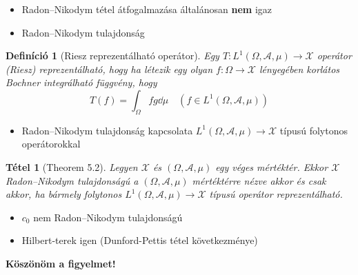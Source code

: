 \documentclass{beamer} %
\newtheorem{theo}[lem]{Tétel}
\newtheorem{defi}[lem]{Definíció}
\begin{document}
\begin{frame}
\justifying
\begin{itemize}
\item Radon\---Nikodym tétel átfogalmazása általánosan \textbf{nem} igaz
\pause \item Radon\---Nikodym tulajdonság
\end{itemize}
\pause \begin{defi}[Riesz reprezentálható operátor] Egy $T \colon L^1(\Omega, \mathcal{A}, \mu) \to \mathcal{X}$ operátor (Riesz) reprezentálható, hogy ha létezik egy olyan $f\colon \Omega \to \mathcal{X}$ lényegében korlátos Bochner integrálható függvény, hogy
$$T(f) = \int_{\Omega} fg \dd{\mu} \quad(f \in L^1(\Omega, \mathcal{A}, \mu))$$
\end{defi}
\begin{itemize}
\item Radon\---Nikodym tulajdonság kapcsolata $L^1(\Omega, \mathcal{A}, \mu) \to \mathcal{X}$ típusú folytonos operátorokkal
\end{itemize}
\end{frame}
\begin{frame}
\justifying
\begin{theo}[Theorem 5.2] Legyen $\mathcal{X}$ és $(\Omega, \mathcal{A}, \mu)$ egy véges mértéktér. Ekkor $\mathcal{X}$ Radon\---Nikodym tulajdonságú a $(\Omega, \mathcal{A}, \mu)$ mértéktérre nézve akkor és csak akkor, ha bármely folytonos $L^1(\Omega, \mathcal{A}, \mu) \to \mathcal{X}$ típusú operátor reprezentálható.
\end{theo}
\begin{itemize}
\pause \item $c_0$ nem Radon\---Nikodym tulajdonságú
\pause \item Hilbert-terek igen (Dunford-Pettis tétel következménye)
\end{itemize}
\end{frame}
\begin{frame}
\center
\textbf{Köszönöm a figyelmet!}
\end{frame}
\end{document}
